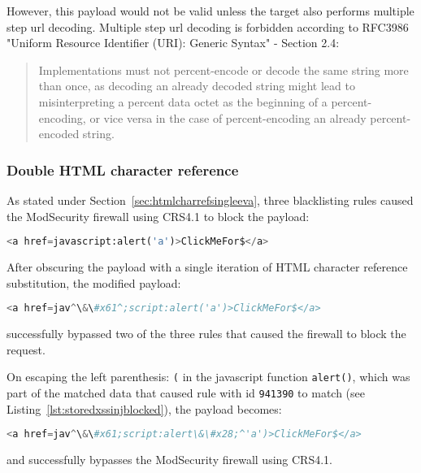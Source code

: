 However, this payload would not be valid unless the target also performs multiple step url decoding. Multiple step url decoding is forbidden according to RFC3986 "Uniform Resource Identifier (URI): Generic Syntax" - Section 2.4:
\begin{quote}
	Implementations must not
	percent-encode or decode the same string more than once, as decoding
	an already decoded string might lead to misinterpreting a percent
	data octet as the beginning of a percent-encoding, or vice versa in
	the case of percent-encoding an already percent-encoded string.
\end{quote}

\subsubsection{Double HTML character reference}
\label{sec:doublehtmlcharref}
As stated under Section~\ref{sec:htmlcharrefsingleeva}, three blacklisting rules caused the ModSecurity firewall using CRS4.1 to block the payload:

\begin{lstlisting}[style=basicStyle, language=Python]
<a href=javascript:alert('a')>ClickMeFor$</a>
\end{lstlisting}

After obscuring the payload with a single iteration of HTML character reference substitution, the modified payload:

\begin{lstlisting}[style=basicStyle, language=Python, escapeinside=\^\^]
<a href=jav^\&\#x61^;script:alert('a')>ClickMeFor$</a>
\end{lstlisting}

successfully bypassed two of the three rules that caused the firewall to block the request.

On escaping the left parenthesis: \verb|(| in the javascript function \verb|alert()|, which was part of the matched data that caused rule with id \verb|941390| to match (see Listing~\ref{lst:storedxssinjblocked}), the payload becomes:

\begin{lstlisting}[style=basicStyle, language=Python, caption=HTML character reference bypass, label={lst:htmlcharacterreferencebypass}, escapeinside=\^\^]
<a href=jav^\&\#x61;script:alert\&\#x28;^'a')>ClickMeFor$</a>
\end{lstlisting}

and successfully bypasses the ModSecurity firewall using CRS4.1.


